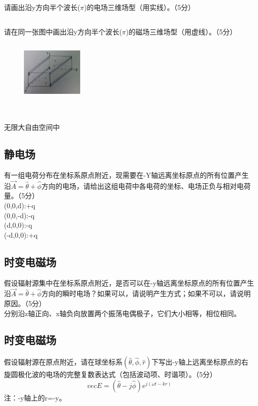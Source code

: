 \documentclass[UTF8]{ctexart}
\begin{document}
\subsection{}
请画出沿y方向半个波长($\pi$)的电场三维场型（用实线）。（5分）
\subsection{}
请在同一张图中画出沿y方向半个波长($\pi$)的磁场三维场型（用虚线）。（5分）
\begin{figure}[H]
\centering
\includegraphics[width=3cm,height=3cm]{2020-2.jpg}
\end{figure}
\section{}
无限大自由空间中
\subsection{静电场}
有一组电荷分布在坐标系原点附近，现需要在-Y轴远离坐标原点的所有位置产生沿$\vec A=\hat\theta+\hat\phi$方向的电场，请给出这组电荷中各电荷的坐标、电场正负与相对电荷量。（5分）\\
(0,0,d):+q\\
(0,0,-d):-q\\
(d,0,0):-q\\
(-d,0,0):+q
\subsection{时变电磁场}
假设辐射源集中在坐标系原点附近，是否可以在-y轴远离坐标原点的所有位置产生沿$\vec A=\hat\theta+\hat\phi$方向的瞬时电场？如果可以，请说明产生方式；如果不可以，请说明原因。（5分）\\
分别沿z轴正向、x轴负向放置两个振荡电偶极子，它们大小相等，相位相同。
\subsection{时变电磁场}
假设辐射源在原点附近，请在球坐标系$(\hat\theta,\hat\phi,\hat r)$下写出-y轴上远离坐标原点的右旋圆极化波的电场的完整复数表达式（包括波动项、时谐项）。（5分）
\[vec E=(\hat\theta-j\hat\phi)e^{j(\omega t-kr)}\]
注：-y轴上的r=-y。
\end{document}
